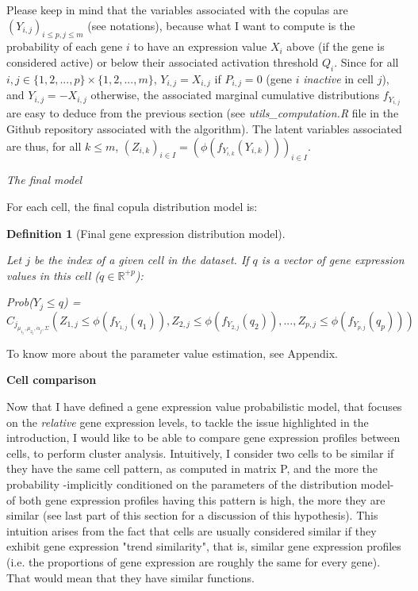 \documentclass{report}
\newtheorem{definition}{Definition}[section]
\begin{document}
Please keep in mind that the variables associated with the copulas are $(Y_{i,j})_{i \leq p, j \leq m}$ (see notations), because what I want to compute is the probability of each gene $i$ to have an expression value $X_i$ above (if the gene is considered active) or below their associated activation threshold $Q_i$. Since for all $i,j \in \{1,2,...,p\} \times \{1,2,...,m\}$, $Y_{i,j} = X_{i,j}$ if $P_{i,j} = 0$ (gene $i$ \emph{inactive} in cell $j$), and $Y_{i,j} = -X_{i,j}$ otherwise, the associated marginal cumulative distributions $f_{Y_{i,j}}$ are easy to deduce from the previous section (see \emph{utils\_computation.R} file in the Github repository associated with the algorithm). The latent variables associated are thus, for all $k \leq m$, $(Z_{i,k})_{i \in I} = (\phi(f_{Y_{i,k}}(Y_{i,k})))_{i \in I}$.

\bigskip
\noindent \textit{The final model}
\bigskip

For each cell, the final copula distribution model is:

\begin{definition}[Final gene expression distribution model]\label{cellcopula}{Let $j$ be the index of a given cell in the dataset. If $q$ is a vector of gene expression values in this cell ($q \in \mathbb{R}^{+p}$):\begin{center} 
\textit{Prob}($Y_j \leq q$) = $C_j_{\mu_1_j, \mu_2_j, \alpha_j, \Sigma}(Z_{1,j} \leq \phi(f_{Y_{1,j}}(q_1)), Z_{2,j} \leq \phi(f_{Y_{2,j}}(q_2)), ..., Z_{p,j} \leq \phi(f_{Y_{p,j}}(q_p)))$\end{center}}\end{definition}

To know more about the parameter value estimation, see Appendix.

\bigskip
\noindent \textbf{Cell comparison}
\bigskip

Now that I have defined a gene expression value probabilistic model, that focuses on the \emph{relative} gene expression levels, to tackle the issue highlighted in the introduction, I would like to be able to compare gene expression profiles between cells, to perform cluster analysis. Intuitively, I consider two cells to be similar if they have the same cell pattern, as computed in matrix P, and the more the probability -implicitly conditioned on the parameters of the distribution model- of both gene expression profiles having this pattern is high, the more they are similar (see last part of this section for a discussion of this hypothesis). This intuition arises from the fact that cells are usually considered similar if they exhibit gene expression "trend similarity"\cite{jaskowiak2014selection}, that is, similar gene expression profiles (i.e. the proportions of gene expression are roughly the same for every gene). That would mean that they have similar functions.\\
\end{document}
